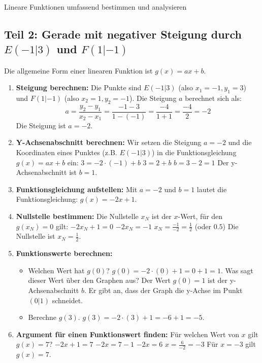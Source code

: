 \begin{loesungsumgebung}{Lineare Funktionen umfassend bestimmen und analysieren}
\bigskip %

\subsection*{Teil 2: Gerade mit negativer Steigung durch $E(-1|3)$ und $F(1|-1)$}
Die allgemeine Form einer linearen Funktion ist $g(x) = ax+b$.

\begin{enumerate}[label=(\alph*)]
    \item \textbf{Steigung berechnen:}
    Die Punkte sind $E(-1|3)$ (also $x_1=-1, y_1=3$) und $F(1|-1)$ (also $x_2=1, y_2=-1$).
    Die Steigung $a$ berechnet sich als:
    $$ a = \frac{y_2 - y_1}{x_2 - x_1} = \frac{-1 - 3}{1 - (-1)} = \frac{-4}{1+1} = \frac{-4}{2} = -2 $$
    Die Steigung ist $a=-2$.

    \item \textbf{Y-Achsenabschnitt berechnen:}
    Wir setzen die Steigung $a=-2$ und die Koordinaten eines Punktes (z.B. $E(-1|3)$) in die Funktionsgleichung $g(x) = ax+b$ ein:
    $3 = -2 \cdot (-1) + b$
    $3 = 2 + b$
    $b = 3 - 2 = 1$
    Der y-Achsenabschnitt ist $b=1$.

    \item \textbf{Funktionsgleichung aufstellen:}
    Mit $a=-2$ und $b=1$ lautet die Funktionsgleichung:
    $g(x) = -2x + 1$.

    \item \textbf{Nullstelle bestimmen:}
    Die Nullstelle $x_N$ ist der $x$-Wert, für den $g(x_N)=0$ gilt:
    $-2x_N + 1 = 0$
    $-2x_N = -1$
    $x_N = \frac{-1}{-2} = \frac{1}{2}$ (oder $0.5$)
    Die Nullstelle ist $x_N = \frac{1}{2}$.

    \item \textbf{Funktionswerte berechnen:}
    \begin{itemize}
        \item Welchen Wert hat $g(0)$?
        $g(0) = -2 \cdot (0) + 1 = 0 + 1 = 1$.
        Was sagt dieser Wert über den Graphen aus? Der Wert $g(0)=1$ ist der y-Achsenabschnitt $b$. Er gibt an, dass der Graph die y-Achse im Punkt $(0|1)$ schneidet.
        \item Berechne $g(3)$.
        $g(3) = -2 \cdot (3) + 1 = -6 + 1 = -5$.
    \end{itemize}

    \item \textbf{Argument für einen Funktionswert finden:} Für welchen Wert von $x$ gilt $g(x) = 7$?
    $-2x + 1 = 7$
    $-2x = 7 - 1$
    $-2x = 6$
    $x = \frac{6}{-2} = -3$
    Für $x=-3$ gilt $g(x)=7$.


\end{enumerate}
\end{loesungsumgebung}
